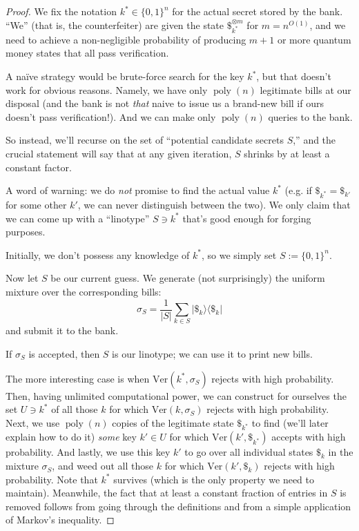 \documentclass[11pt]{report}
\theoremstyle{plain}
\theoremstyle{definition}
\newcommand{\poly}{\operatorname{poly}}
\newcommand{\ketbra}[2]{|#1\rangle\!\langle#2|}
\newcommand{\proj}[1]{\ketbra{#1}{#1}}
\begin{document}
\begin{proof}
We fix the notation $k^\ast\in\{0,1\}^n$ for the actual secret stored by the bank.  ``We'' (that is, the counterfeiter) are given the state $\$_{k^\ast}^{\otimes m}$ for $m=n^{O(1)}$, and we need to achieve a non-negligible probability of producing $m+1$ or more quantum money states that all pass verification.

A na\"{i}ve strategy would be brute-force search for the key $k^\ast$, but that doesn't work for obvious reasons.  Namely, we have only $\poly(n)$ legitimate bills at our disposal (and the bank is not {\em that} naive to issue us a brand-new bill if ours doesn't pass verification!). And we can make only $\poly(n)$ queries to the bank.

So instead, we'll recurse on the set of ``potential candidate secrets $S$,'' and the crucial statement will say that at any given iteration, $S$ shrinks by at least a constant factor.

A word of warning: we do {\em not} promise to find the actual value $k^\ast$ (e.g. if $\$_{k^\ast}=\$_{k'}$ for some other $k'$, we can never distinguish between the two). We only claim that we can come up with a ``linotype'' $S\ni k^\ast$ that's good enough for forging purposes.

Initially, we don't possess any knowledge of $k^\ast$, so we simply set $S:=\{0,1\}^n$.

Now let $S$ be our current guess.  We generate (not surprisingly) the uniform mixture over the corresponding bills:
$$
\sigma_S = \frac 1{|S|} \sum_{k\in S} \proj{\$_k}
$$
and submit it to the bank.

If $\sigma_S$ is accepted, then $S$ is our linotype; we can use it to print new bills.

The more interesting case is when $\mathrm{Ver}(k^\ast,\sigma_S)$ rejects with high probability. Then, having unlimited computational power, we can construct for ourselves the set $U\ni k^\ast$ of all those $k$ for which $\mathrm{Ver}(k,\sigma_S)$ rejects with high probability. Next, we use $\poly(n)$ copies of the legitimate state $\$_{k^\ast}$ to find (we'll later explain how to do it) {\em some} key $k'\in U$ for which $\mathrm{Ver}(k',\$_{k^\ast})$ accepts with high probability.  And lastly, we use this key $k'$ to go over all individual states $\$_k$ in the mixture $\sigma_S$, and weed out all those $k$ for which $\mathrm{Ver}(k',\$_k)$ rejects with high probability. Note that $k^\ast$ survives (which is the only property we need to maintain).  Meanwhile, the fact that at least a constant fraction of entries in $S$ is removed follows from going through the definitions and from a simple application of Markov's inequality.


\end{proof}
\end{document}
